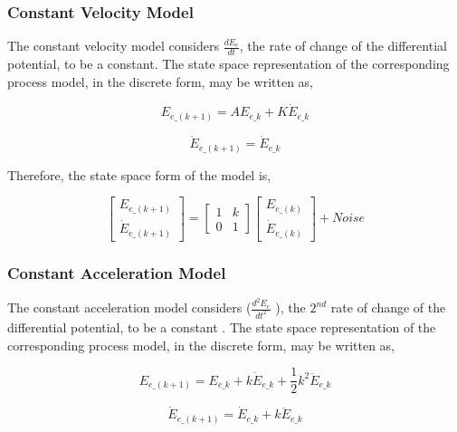 \documentclass[transmag]{IEEEtran}
\begin{document}
\subsubsection{Constant Velocity Model}

The constant velocity model considers $\frac{dE_e}{dt}$, the rate of change of the differential potential, to be a constant. The state space representation of the corresponding process model, in the discrete form, may be written as, 

\begin{equation}
E_{e\_(k+1)} = AE_{e\_k} + K\dot{E}_{e\_k}
\end{equation}

\begin{equation}
\dot{E}_{e\_(k+1)} = \dot{E}_{e\_k}
\end{equation}

Therefore, the state space form of the model is, 

\begin{equation}
 \begin{bmatrix} E_{e\_(k+1)} \\ \dot{E}_{e\_(k+1)} \end{bmatrix}  =  \begin{bmatrix} 1 & k \\ 0 & 1 \end{bmatrix} \begin{bmatrix} E_{e\_(k)} \\ \dot{E}_{e\_(k)} \end{bmatrix} + Noise
\end{equation}




\subsubsection{Constant Acceleration Model}

The constant acceleration model considers ($\frac{d^2E_e}{dt^2}$ ),  the $2^{nd}$ rate of change of the differential potential, to be a constant \cite{ref7}. The state space representation of the corresponding process model, in the discrete form, may be written as, 


\begin{equation}
E_{e\_(k+1)} = E_{e\_k} + k\dot{E}_{e\_k} + \frac{1}{2}k^2\ddot{E}_{e\_k} 
\end{equation}

\begin{equation}
\dot{E}_{e\_(k+1)} = \dot{E}_{e\_k} + k\ddot{E}_{e\_k} 
\end{equation}
\end{document}
